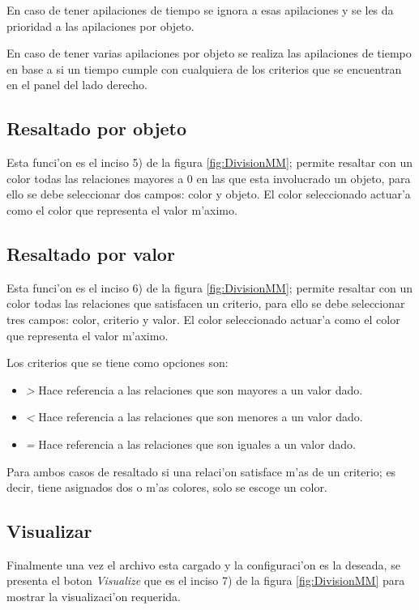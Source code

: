 En caso de tener apilaciones de tiempo se ignora a esas apilaciones y se les da prioridad a las apilaciones por objeto.

En caso de tener varias apilaciones por objeto se realiza las apilaciones de tiempo en base a si un tiempo cumple con cualquiera de los criterios que se encuentran en el panel del lado derecho.

\subsection{Resaltado por objeto}
Esta funci'on es el inciso 5) de la figura \ref{fig:DivisionMM}; permite resaltar con un color todas las relaciones mayores a 0 en las que esta involucrado un objeto, para ello se debe seleccionar dos campos: color y objeto. El color seleccionado actuar'a como el color que representa el valor m'aximo.

\subsection{Resaltado por valor}
Esta funci'on es el inciso 6) de la figura \ref{fig:DivisionMM}; permite resaltar con un color todas las relaciones que satisfacen un criterio, para ello se debe seleccionar tres campos: color, criterio y valor. El color seleccionado actuar'a como el color que representa el valor m'aximo.

Los criterios que se tiene como opciones son:
\begin{itemize}
\item \emph{\textgreater} Hace referencia a las relaciones que son mayores a un valor dado.
\item \emph{\textless} Hace referencia a las relaciones que son menores a un valor dado.
\item \emph{=} Hace referencia a las relaciones que son iguales a un valor dado.
\end{itemize}

Para ambos casos de resaltado si una relaci'on satisface m'as de un criterio; es decir, tiene asignados dos o m'as colores, solo se escoge un color.

\subsection{Visualizar}
Finalmente una vez el archivo esta cargado y la configuraci'on es la deseada, se presenta el boton \emph{Visualize} que es el inciso 7) de la figura \ref{fig:DivisionMM} para mostrar la visualizaci'on requerida.